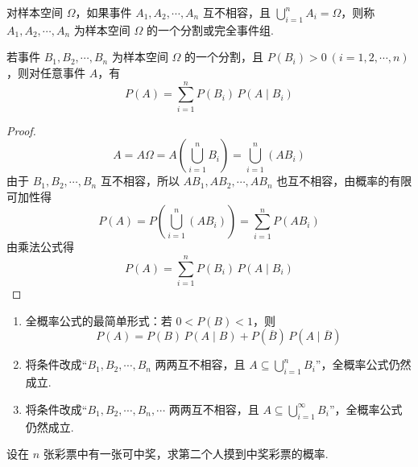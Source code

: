 \begin{definition}
    \indent 对样本空间 $\varOmega$，如果事件 $A_1,A_2,\cdots,A_n$ 互不相容，且 $\displaystyle\bigcup_{i=1}^n A_i=\varOmega$，则称 $A_1,A_2,\cdots,A_n$ 为样本空间 $\varOmega$ 的一个{\heiti 分割}或{\heiti 完全事件组}.
\end{definition}

\begin{theorem}[][全概率公式]
    \indent 若事件 $B_1,B_2,\cdots,B_n$ 为样本空间 $\varOmega$ 的一个分割，且 $P(B_i)>0 \ (i=1,2,\cdots,n)$，则对任意事件 $A$，有
    \begin{equation} \label{equation:total}
        P(A) = \sum_{i=1}^n P(B_i) \, P(A \mid B_i)
    \end{equation}
\end{theorem}

\begin{proof}
    $$
    A = A \varOmega = A \left( \bigcup_{i=1}^n B_i \right) = \bigcup_{i=1}^n(A B_i)
    $$
    由于 $B_1,B_2,\cdots,B_n$ 互不相容，所以 $A B_1, A B_2, \cdots, A B_n$ 也互不相容，由概率的有限可加性得
    $$
    P(A) = P \left( \bigcup_{i=1}^n (A B_i) \right) = \sum_{i=1}^n P(A B_i)
    $$
    由乘法公式得
    $$
    P(A) = \sum_{i=1}^n P(B_i) \, P(A \mid B_i)
    $$
\end{proof}

\begin{note}
    \begin{enumerate}
        \item 全概率公式的最简单形式：若 $0 < P(B) < 1$，则
        $$
        P(A) = P(B) \, P(A \mid B) + P(\overline{B}) \, P(A \mid \overline{B})
        $$
        \item 将条件改成“$B_1, B_2, \cdots, B_n$ 两两互不相容，且 $A \subseteq \displaystyle\bigcup_{i=1}^n B_i$”，全概率公式仍然成立.
        \item 将条件改成“$B_1, B_2, \cdots, B_n, \cdots$ 两两互不相容，且 $A \subseteq \displaystyle\bigcup_{i=1}^{\infty} B_i$”，全概率公式仍然成立.
    \end{enumerate}
\end{note}

\begin{example}
    \indent 设在 $n$ 张彩票中有一张可中奖，求第二个人摸到中奖彩票的概率.
\end{example}

